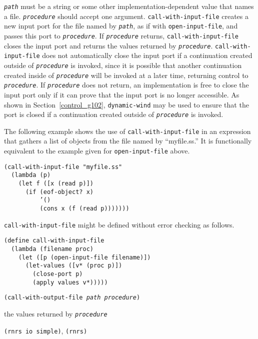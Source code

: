 \texttt{\textit{path}} must be a string or some other implementation-dependent 
value that names a file.
\texttt{\textit{procedure}} should accept one argument.
\texttt{call-with-input-file} creates a new input port for the file named
by \texttt{\textit{path}}, as if with \texttt{open-input-file}, and passes this port to \texttt{\textit{procedure}}.
If \texttt{\textit{procedure}} returns, \texttt{call-with-input-file} closes the input port
and returns the values returned by \texttt{\textit{procedure}}.
\texttt{call-with-input-file} does not automatically close the input
port if a continuation created outside of \texttt{\textit{procedure}} is invoked, since it
is possible that another continuation created inside of \texttt{\textit{procedure}} will be
invoked at a later time, returning control to \texttt{\textit{procedure}}.
If \texttt{\textit{procedure}} does not return, an implementation is free to close the
input port only if it can prove that the input port is no longer accessible.
As shown in Section \ref{control_g102}, \texttt{dynamic-wind} may be used to
ensure that the port is closed if a continuation created outside of
\texttt{\textit{procedure}} is invoked.

The following example shows the use of \texttt{call-with-input-file}
in an expression that gathers
a list of objects from the file named by ``myfile.ss.''
It is functionally equivalent to the example given for
\texttt{open-input-file} above.


\begin{alltt}
(call-with-input-file "myfile.ss"
  (lambda (p)
    (let f ([x (read p)])
      (if (eof-object? x)
          '()
          (cons x (f (read p)))))))
\end{alltt}

\texttt{call-with-input-file} might be defined without error checking as follows.

\begin{alltt}
(define call-with-input-file
  (lambda (filename proc)
    (let ([p (open-input-file filename)])
      (let-values ([v* (proc p)])
        (close-port p)
        (apply values v*)))))
\end{alltt}

\begin{description}

\label{io_s78}\item[procedure] \texttt{(call-with-output-file \textit{path} \textit{procedure})}



\item[returns] the values returned by \texttt{\textit{procedure}}


\item[libraries] \texttt{(rnrs io simple)}, \texttt{(rnrs)}
\end{description}

